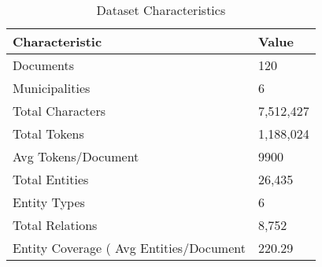 \begin{table}
\caption{Dataset Characteristics}
\label{tab:dataset_char}
\begin{tabular}{ll}
\toprule
Characteristic & Value \\
\midrule
Documents & 120 \\
Municipalities & 6 \\
Total Characters & 7,512,427 \\
Total Tokens & 1,188,024 \\
Avg Tokens/Document & 9900 \\
Total Entities & 26,435 \\
Entity Types & 6 \\
Total Relations & 8,752 \\
Entity Coverage (%
Avg Entities/Document & 220.29 \\
\bottomrule
\end{tabular}
\end{table}
